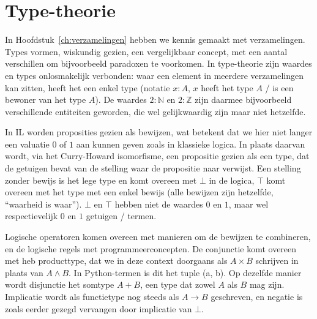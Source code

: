 \section{Type-theorie}
In Hoofdstuk~\ref{ch:verzamelingen} hebben we kennis gemaakt met verzamelingen. Types vormen, wiskundig gezien, een vergelijkbaar concept, met een aantal verschillen om bijvoorbeeld paradoxen te voorkomen. In type-theorie zijn waardes en types onlosmakelijk verbonden: waar een element in meerdere verzamelingen kan zitten, heeft het een enkel type (notatie $x : A$, $x$ heeft het type $A$ / is een bewoner van het type $A$). De waardes $2 : \mathbb{N}$ en $2 : \mathbb{Z}$ zijn daarmee bijvoorbeeld verschillende entiteiten geworden, die wel gelijkwaardig zijn maar niet hetzelfde.

In IL worden proposities gezien als bewijzen, wat betekent dat we hier niet langer een valuatie $0$ of $1$ aan kunnen geven zoals in klassieke logica. In plaats daarvan wordt, via het Curry-Howard isomorfisme, een propositie gezien als een type, dat de getuigen bevat van de stelling waar de propositie naar verwijst. Een stelling zonder bewijs is het lege type en komt overeen met $\bot$ in de logica, $\top$ komt overeen met het type met een enkel bewijs (alle bewijzen zijn hetzelfde, \enquote{waarheid is waar}). $\bot$ en $\top$ hebben niet de waardes $0$ en $1$, maar wel respectievelijk $0$ en $1$ getuigen / termen. 

Logische operatoren komen overeen met manieren om de bewijzen te combineren, en de logische regels met programmeerconcepten.  De conjunctie komt overeen met heb producttype, dat we in deze context doorgaans als $A \times B$ schrijven in plaats van $A \land B$. In Python-termen is dit het tuple \textsf{(a, b)}. Op dezelfde manier wordt disjunctie het somtype $A + B$, een type dat zowel $A$ als $B$ mag zijn. Implicatie wordt als functietype nog steeds als $A \to B$ geschreven, en negatie is zoals eerder gezegd vervangen door implicatie van $\bot$.


